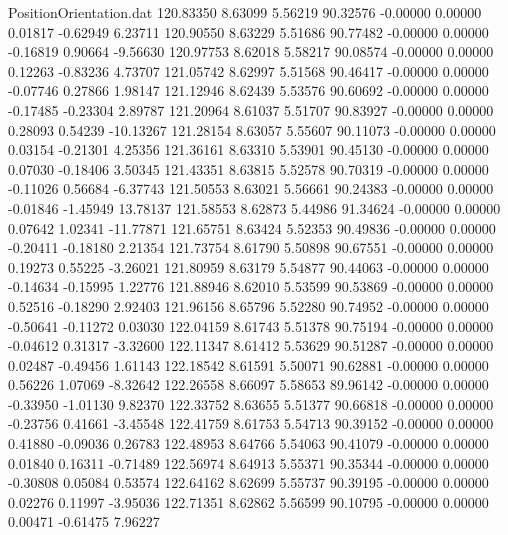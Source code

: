 \begin{filecontents}{PositionOrientation.dat}
 120.83350    8.63099    5.56219    90.32576   -0.00000    0.00000    0.01817   -0.62949    6.23711
 120.90550    8.63229    5.51686    90.77482   -0.00000    0.00000   -0.16819    0.90664   -9.56630
 120.97753    8.62018    5.58217    90.08574   -0.00000    0.00000    0.12263   -0.83236    4.73707
 121.05742    8.62997    5.51568    90.46417   -0.00000    0.00000   -0.07746    0.27866    1.98147
 121.12946    8.62439    5.53576    90.60692   -0.00000    0.00000   -0.17485   -0.23304    2.89787
 121.20964    8.61037    5.51707    90.83927   -0.00000    0.00000    0.28093    0.54239  -10.13267
 121.28154    8.63057    5.55607    90.11073   -0.00000    0.00000    0.03154   -0.21301    4.25356
 121.36161    8.63310    5.53901    90.45130   -0.00000    0.00000    0.07030   -0.18406    3.50345
 121.43351    8.63815    5.52578    90.70319   -0.00000    0.00000   -0.11026    0.56684   -6.37743
 121.50553    8.63021    5.56661    90.24383   -0.00000    0.00000   -0.01846   -1.45949   13.78137
 121.58553    8.62873    5.44986    91.34624   -0.00000    0.00000    0.07642    1.02341  -11.77871
 121.65751    8.63424    5.52353    90.49836   -0.00000    0.00000   -0.20411   -0.18180    2.21354
 121.73754    8.61790    5.50898    90.67551   -0.00000    0.00000    0.19273    0.55225   -3.26021
 121.80959    8.63179    5.54877    90.44063   -0.00000    0.00000   -0.14634   -0.15995    1.22776
 121.88946    8.62010    5.53599    90.53869   -0.00000    0.00000    0.52516   -0.18290    2.92403
 121.96156    8.65796    5.52280    90.74952   -0.00000    0.00000   -0.50641   -0.11272    0.03030
 122.04159    8.61743    5.51378    90.75194   -0.00000    0.00000   -0.04612    0.31317   -3.32600
 122.11347    8.61412    5.53629    90.51287   -0.00000    0.00000    0.02487   -0.49456    1.61143
 122.18542    8.61591    5.50071    90.62881   -0.00000    0.00000    0.56226    1.07069   -8.32642
 122.26558    8.66097    5.58653    89.96142   -0.00000    0.00000   -0.33950   -1.01130    9.82370
 122.33752    8.63655    5.51377    90.66818   -0.00000    0.00000   -0.23756    0.41661   -3.45548
 122.41759    8.61753    5.54713    90.39152   -0.00000    0.00000    0.41880   -0.09036    0.26783
 122.48953    8.64766    5.54063    90.41079   -0.00000    0.00000    0.01840    0.16311   -0.71489
 122.56974    8.64913    5.55371    90.35344   -0.00000    0.00000   -0.30808    0.05084    0.53574
 122.64162    8.62699    5.55737    90.39195   -0.00000    0.00000    0.02276    0.11997   -3.95036
 122.71351    8.62862    5.56599    90.10795   -0.00000    0.00000    0.00471   -0.61475    7.96227

\end{filecontents}
